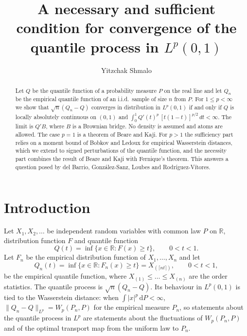 \documentclass[11pt]{amsart}
\makeatletter
\newcommand{\AUTHORNAME}{Yitzchak Shmalo}
\newcommand{\AFFILIATION}{Einstein Institute of Mathematics, The Hebrew University of Jerusalem, Jerusalem, Israel}
\newcommand{\AUTHOREMAIL}{yitzchak.shmalo@gmail.com}
\theoremstyle{remark}
\newcommand{\R}{\mathbb{R}}
\newcommand{\dd}{\,\mathrm{d}}
\makeatother
\begin{document}
\title[The quantile process in $L^p$]{A necessary and sufficient condition for convergence of the quantile process in $L^p(0,1)$}

\author{\AUTHORNAME}
\address{\AFFILIATION}
\email{\AUTHOREMAIL}


\begin{abstract}
Let $Q$ be the quantile function of a probability measure $P$ on the real line and let $Q_n$ be the empirical quantile function of an i.i.d.\ sample of size $n$ from $P$. For $1\le p<\infty$ we show that $\sqrt n(Q_n-Q)$ converges in distribution in $L^p(0,1)$ if and only if $Q$ is locally absolutely continuous on $(0,1)$ and $\int_0^1 Q'(t)^p\,[t(1-t)]^{p/2}\,dt<\infty$. The limit is $Q'B$, where $B$ is a Brownian bridge. No density is assumed and atoms are allowed. The case $p=1$ is a theorem of Beare and Kaji. For $p>1$ the sufficiency part relies on a moment bound of Bobkov and Ledoux for empirical Wasserstein distances, which we extend to signed perturbations of the quantile function, and the necessity part combines the result of Beare and Kaji with Fernique's theorem. This answers a question posed by del Barrio, Gonz\'alez-Sanz, Loubes and Rodr\'iguez-V\'itores.
\end{abstract}

\maketitle

\section{Introduction}\label{sec:intro}

Let $X_1,X_2,\dots$ be independent random variables with common law $P$ on $\R$, distribution function $F$ and quantile function
\[
Q(t)=\inf\{x\in\R: F(x)\ge t\},\qquad 0<t<1.
\]
Let $F_n$ be the empirical distribution function of $X_1,\dots,X_n$ and let
\[
Q_n(t)=\inf\{x\in\R:F_n(x)\ge t\}=X_{(\lceil nt\rceil)},\qquad 0<t<1,
\]
be the empirical quantile function, where $X_{(1)}\le\dots\le X_{(n)}$ are the order statistics. The quantile process is $\sqrt n(Q_n-Q)$. Its behaviour in $L^p(0,1)$ is tied to the Wasserstein distance: when $\int|x|^p\dd P<\infty$, $\|Q_n-Q\|_{L^p}=W_p(P_n,P)$ for the empirical measure $P_n$, so statements about the quantile process in $L^p$ are statements about the fluctuations of $W_p(P_n,P)$ and of the optimal transport map from the uniform law to $P_n$.
\end{document}
